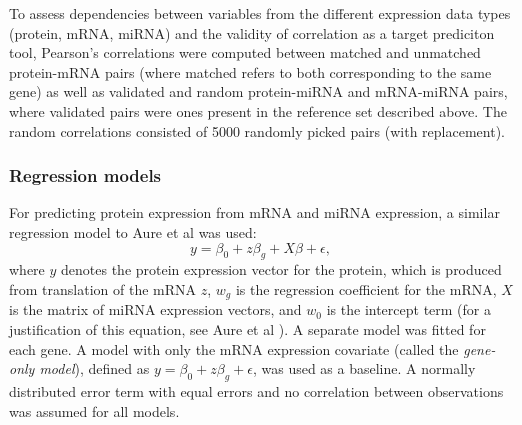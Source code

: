 To assess dependencies between variables from the different expression data
types (protein, mRNA, miRNA) and the validity of correlation as a target
prediciton tool, Pearson's correlations were computed between matched and
unmatched protein-mRNA pairs (where matched refers to both corresponding to
the same gene) as well as validated and random protein-miRNA and mRNA-miRNA
pairs, where validated pairs were ones present in the reference set described
above. The random correlations consisted of 5000 randomly picked pairs (with
replacement).




\subsubsection{Regression models}

For predicting protein expression from mRNA and miRNA expression, a similar
regression model to Aure et al was used:
\begin{equation}
	\label{eq:reg-model}
	y = \beta_0 + z \beta_g + X \beta + \epsilon,
\end{equation}
where $y$ denotes the protein expression vector for the protein, which
is produced from translation of the mRNA $z$, $w_g$
is the regression coefficient for the mRNA, $X$ is the matrix of miRNA
expression vectors, and $w_0$ is the intercept term
(for a justification of this equation, see Aure et al \citep{Aure2015}).
A separate model was fitted for each gene.
A model with only the mRNA expression covariate (called the \emph{gene-only model}),
defined as $y = \beta_0 + z \beta_g + \epsilon$, was used as a baseline.
A normally distributed error term with equal errors and no correlation
between observations was assumed for all models.


